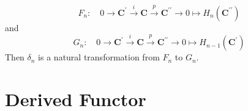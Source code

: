 \documentclass[12pt, oneside]{book}
\begin{document}
\begin{theorem}
\begin{remark}
\begin{equation*}
            F_n:
            \quad
            0 \rightarrow \mathbf{C}^{\prime} \xrightarrow{i} \mathbf{C} \xrightarrow{p} \mathbf{C}^{\prime \prime} \rightarrow 0
            \mapsto
            H_n\left(\mathbf{C}^{\prime \prime}\right)
        \end{equation*}
        and
        \begin{equation*}
            G_n:
            \quad
            0 \rightarrow \mathbf{C}^{\prime} \xrightarrow{i} \mathbf{C} \xrightarrow{p} \mathbf{C}^{\prime \prime} \rightarrow 0
            \mapsto
            H_{n-1}\left(\mathbf{C}^{\prime}\right)
        \end{equation*}
        Then $\delta_n$ is a natural transformation from $F_n$ to $G_n$.
    \end{remark}
\end{theorem}



\section{Derived Functor} %
\end{document}
